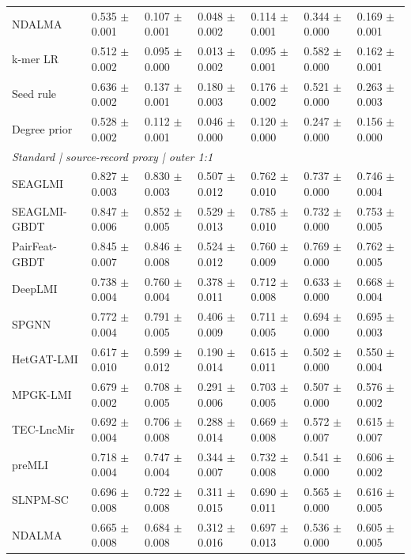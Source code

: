 \begin{landscape}
{\begin{longtable}{lllllll}
NDALMA & 0.535 $\pm$ 0.001 & 0.107 $\pm$ 0.001 & 0.048 $\pm$ 0.002 & 0.114 $\pm$ 0.001 & 0.344 $\pm$ 0.000 & 0.169 $\pm$ 0.001 \\
k-mer LR & 0.512 $\pm$ 0.002 & 0.095 $\pm$ 0.000 & 0.013 $\pm$ 0.002 & 0.095 $\pm$ 0.001 & 0.582 $\pm$ 0.000 & 0.162 $\pm$ 0.001 \\
Seed rule & 0.636 $\pm$ 0.002 & 0.137 $\pm$ 0.001 & 0.180 $\pm$ 0.003 & 0.176 $\pm$ 0.002 & 0.521 $\pm$ 0.000 & 0.263 $\pm$ 0.003 \\
Degree prior & 0.528 $\pm$ 0.002 & 0.112 $\pm$ 0.001 & 0.046 $\pm$ 0.000 & 0.120 $\pm$ 0.000 & 0.247 $\pm$ 0.000 & 0.156 $\pm$ 0.000 \\
\multicolumn{7}{l}{\textit{Standard | source-record proxy | outer 1:1}}\\
SEAGLMI & 0.827 $\pm$ 0.003 & 0.830 $\pm$ 0.003 & 0.507 $\pm$ 0.012 & 0.762 $\pm$ 0.010 & 0.737 $\pm$ 0.000 & 0.746 $\pm$ 0.004 \\
SEAGLMI-GBDT & 0.847 $\pm$ 0.006 & 0.852 $\pm$ 0.005 & 0.529 $\pm$ 0.013 & 0.785 $\pm$ 0.010 & 0.732 $\pm$ 0.000 & 0.753 $\pm$ 0.005 \\
PairFeat-GBDT & 0.845 $\pm$ 0.007 & 0.846 $\pm$ 0.008 & 0.524 $\pm$ 0.012 & 0.760 $\pm$ 0.009 & 0.769 $\pm$ 0.000 & 0.762 $\pm$ 0.005 \\
DeepLMI & 0.738 $\pm$ 0.004 & 0.760 $\pm$ 0.004 & 0.378 $\pm$ 0.011 & 0.712 $\pm$ 0.008 & 0.633 $\pm$ 0.000 & 0.668 $\pm$ 0.004 \\
SPGNN & 0.772 $\pm$ 0.004 & 0.791 $\pm$ 0.005 & 0.406 $\pm$ 0.009 & 0.711 $\pm$ 0.005 & 0.694 $\pm$ 0.000 & 0.695 $\pm$ 0.003 \\
HetGAT-LMI & 0.617 $\pm$ 0.010 & 0.599 $\pm$ 0.012 & 0.190 $\pm$ 0.014 & 0.615 $\pm$ 0.011 & 0.502 $\pm$ 0.000 & 0.550 $\pm$ 0.004 \\
MPGK-LMI & 0.679 $\pm$ 0.002 & 0.708 $\pm$ 0.005 & 0.291 $\pm$ 0.006 & 0.703 $\pm$ 0.005 & 0.507 $\pm$ 0.000 & 0.576 $\pm$ 0.002 \\
TEC-LncMir & 0.692 $\pm$ 0.004 & 0.706 $\pm$ 0.008 & 0.288 $\pm$ 0.014 & 0.669 $\pm$ 0.008 & 0.572 $\pm$ 0.007 & 0.615 $\pm$ 0.007 \\
preMLI & 0.718 $\pm$ 0.004 & 0.747 $\pm$ 0.004 & 0.344 $\pm$ 0.007 & 0.732 $\pm$ 0.008 & 0.541 $\pm$ 0.000 & 0.606 $\pm$ 0.002 \\
SLNPM-SC & 0.696 $\pm$ 0.008 & 0.722 $\pm$ 0.008 & 0.311 $\pm$ 0.015 & 0.690 $\pm$ 0.011 & 0.565 $\pm$ 0.000 & 0.616 $\pm$ 0.005 \\
NDALMA & 0.665 $\pm$ 0.008 & 0.684 $\pm$ 0.008 & 0.312 $\pm$ 0.016 & 0.697 $\pm$ 0.013 & 0.536 $\pm$ 0.000 & 0.605 $\pm$ 0.005 \\

\end{longtable}}
\end{landscape}
